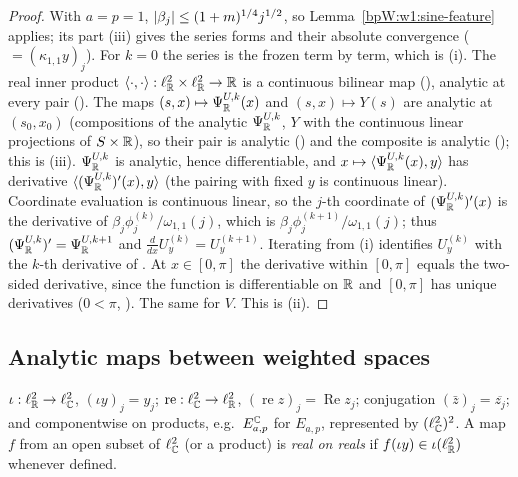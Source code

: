 \begin{proof}
\label{stepW:w1:bil}
With $a=p=1$, $\lvert \beta_j\rvert\le(1+m)^{1/4}j^{1/2}$, so Lemma~\ref{bpW:w1:sine-feature} applies; its part (iii) gives
the series forms and their absolute convergence ( $=(\kappa_{1,1}y)_j$). For $k=0$ the series is the
frozen  term by term, which is (i).
\label{stepW:w1:recanalytic}
The real inner product $\langle\cdot,\cdot\rangle:\ell^2_{\mathbb{R}}\times\ell^2_{\mathbb{R}}\to\mathbb{R}$ is a continuous bilinear map
(), analytic at every pair (). The maps
$(s,x)\mapsto\Psi^{U,k}_{\mathbb{R}}(x)$ and $(s,x)\mapsto Y(s)$ are analytic at $(s_0,x_0)$ (compositions of the analytic
$\Psi^{U,k}_{\mathbb{R}}$, $Y$ with the continuous linear projections of $S\times\mathbb{R}$), so their pair is analytic
() and the composite is analytic (); this is (iii).
\label{stepW:w1:recder}
$\Psi^{U,k}_{\mathbb{R}}$ is analytic, hence differentiable, and $x\mapsto\langle\Psi^{U,k}_{\mathbb{R}}(x),y\rangle$ has derivative
$\langle(\Psi^{U,k}_{\mathbb{R}})'(x),y\rangle$ (the pairing with fixed $y$ is continuous linear). Coordinate evaluation is
continuous linear, so the $j$-th coordinate of $(\Psi^{U,k}_{\mathbb{R}})'(x)$ is the derivative of
$\beta_j\phi^{(k)}_j/\omega_{1,1}(j)$, which is $\beta_j\phi^{(k+1)}_j/\omega_{1,1}(j)$; thus
$(\Psi^{U,k}_{\mathbb{R}})'=\Psi^{U,k+1}_{\mathbb{R}}$ and $\frac{d}{dx}U^{(k)}_y=U^{(k+1)}_y$. Iterating from (i) identifies
$U^{(k)}_y$ with the $k$-th derivative of . At $x\in[0,\pi]$ the derivative within $[0,\pi]$
equals the two-sided derivative, since the function is differentiable on $\mathbb{R}$ and $[0,\pi]$ has unique derivatives
($0<\pi$, ). The same for $V$. This is (ii).
\end{proof}

\subsection{Analytic maps between weighted spaces}\label{bpW:w1:analytic}

\begin{definition}[Complexification]\label{bpW:w1:complexification}
$\iota:\ell^2_{\mathbb{R}}\to\ell^2_{\mathbb{C}}$, $(\iota y)_j=y_j$; $\operatorname{re}:\ell^2_{\mathbb{C}}\to\ell^2_{\mathbb{R}}$,
$(\operatorname{re}z)_j=\operatorname{Re}z_j$; conjugation $(\bar z)_j=\overline{z_j}$; and componentwise on products,
e.g.\ $E^{\mathbb{C}}_{a,p}$ for $E_{a,p}$, represented by $(\ell^2_{\mathbb{C}})^2$. A map $f$ from an open subset of $\ell^2_{\mathbb{C}}$ (or a
product) is \emph{real on reals} if $f(\iota y)\in\iota(\ell^2_{\mathbb{R}})$ whenever defined.
\end{definition}

